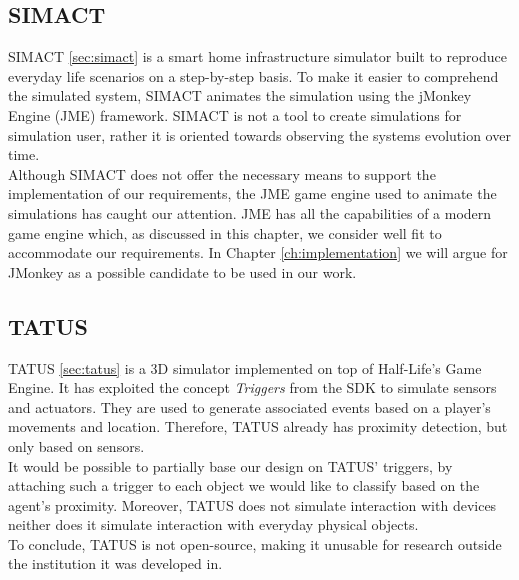 \subsection{SIMACT}\label{subsec:design_simact}
SIMACT \ref{sec:simact} is a smart home infrastructure simulator built to reproduce everyday life scenarios on a step-by-step basis. To make it easier to comprehend the simulated system, SIMACT animates the simulation using the jMonkey Engine (JME) framework. SIMACT is not a tool to create simulations for simulation user, rather it is oriented towards observing the systems evolution over time.\\

Although SIMACT does not offer the necessary means to support the implementation of our requirements, the JME game engine used to animate the simulations has caught our attention. JME has all the capabilities of a modern game engine which, as discussed in this chapter, we consider well fit to accommodate our requirements. In Chapter \ref{ch:implementation} we will argue for JMonkey as a possible candidate to be used in our work.\\

\subsection{TATUS}\label{subsec:design_tatus}
TATUS \ref{sec:tatus} is a 3D simulator implemented on top of Half-Life's Game Engine. It has exploited the concept \emph{Triggers} from the SDK to simulate sensors and actuators. They are used to generate associated events based on a player's movements and location. Therefore, TATUS already has proximity detection, but only based on sensors.\\

It would be possible to partially base our design on TATUS' triggers, by attaching such a trigger to each object we would like to classify based on the agent's proximity. Moreover, TATUS does not simulate interaction with devices neither does it simulate interaction with everyday physical objects.\\

To conclude, TATUS is not open-source, making it unusable for research outside the institution it was developed in.\\

